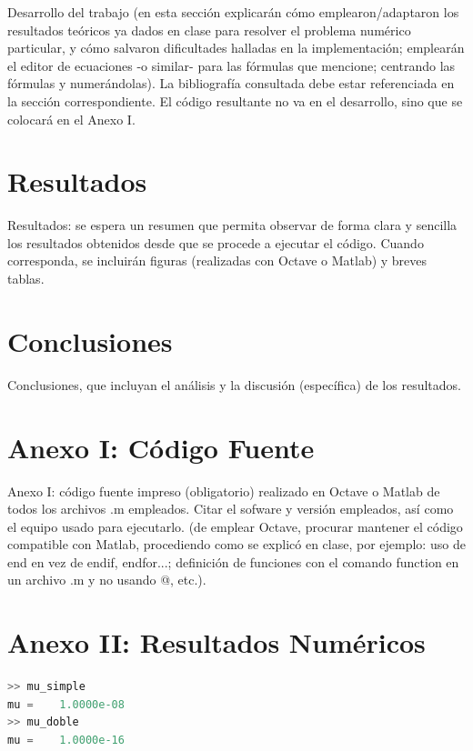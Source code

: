 \documentclass[11pt,a4paper]{article}
\begin{document}
 Desarrollo del trabajo (en esta sección explicarán cómo emplearon/adaptaron los
resultados teóricos ya dados en clase para resolver el problema numérico particular, y cómo
salvaron dificultades halladas en la implementación; emplearán el editor de ecuaciones -o
similar- para las fórmulas que mencione; centrando las fórmulas y numerándolas). La
bibliografía consultada debe estar referenciada en la sección correspondiente. El código
resultante no va en el desarrollo, sino que se colocará en el Anexo I.

\section{Resultados}
 Resultados: se espera un resumen que permita observar de forma clara y sencilla los
resultados obtenidos desde que se procede a ejecutar el código. Cuando corresponda, se
incluirán figuras (realizadas con Octave o Matlab) y breves tablas.

\section{Conclusiones}
 Conclusiones, que incluyan el análisis y la discusión (específica) de los resultados.

\newpage
\appendix
\section{Anexo I: Código Fuente}





Anexo I: código fuente impreso (obligatorio) realizado en Octave o Matlab de todos los
archivos .m empleados. Citar el sofware y versión empleados, así como el equipo usado para
ejecutarlo. (de emplear Octave, procurar mantener el código compatible con Matlab,
procediendo como se explicó en clase, por ejemplo: uso de end en vez de endif, endfor...;
definición de funciones con el comando function en un archivo .m y no usando @, etc.).

\section{Anexo II: Resultados Numéricos}
\begin{lstlisting}[language=Octave]
>> mu_simple
mu =    1.0000e-08
>> mu_doble
mu =    1.0000e-16
\end{lstlisting}
\end{document}
